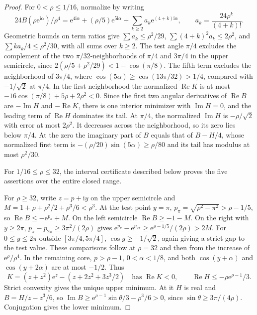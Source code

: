 \documentclass[11pt]{article}
\DeclareMathOperator{\Rea}{Re}
\DeclareMathOperator{\Ima}{Im}
\newcommand{\ee}{\mathrm e}
\newcommand{\ii}{\mathrm i}
\begin{document}
\begin{proof}
For \(0<\rho\le1/16\), normalize by writing
\[
 24B(\rho\ee^{\ii\alpha})/\rho^4
 =\ee^{4\ii\alpha}+(\rho/5)\ee^{5\ii\alpha}
  +\sum_{k\ge2} a_k\ee^{(4+k)\ii\alpha},
 \qquad a_k=\frac{24\rho^k}{(4+k)!}.
\]
Geometric bounds on term ratios give
\(\sum a_k\le\rho^2/29\), \(\sum(4+k)^2a_k\le2\rho^2\), and
\(\sum k a_k/4\le\rho^2/30\), with all sums over \(k\ge2\).
The test angle \(\pi/4\) excludes the complement of the two \(\pi/32\)-neighborhoods of \(\pi/4\) and \(3\pi/4\) in the upper semicircle, since \(2(\rho/5+\rho^2/29)<1-\cos(\pi/8)\). The fifth term excludes the neighborhood of \(3\pi/4\), where \(\cos(5\alpha)\ge\cos(13\pi/32)>1/4\), compared with \(-1/\sqrt2\) at \(\pi/4\). In the first neighborhood the normalized \(\Rea K\) is at most \(-16\cos(\pi/8)+5\rho+2\rho^2<0\). Since the first two angular derivatives of \(\Rea B\) are \(-\Ima H\) and \(-\Rea K\), there is one interior minimizer with \(\Ima H=0\), and the leading term of \(\Rea H\) dominates its tail. At \(\pi/4\), the normalized \(\Ima H\) is \(-\rho/\sqrt2\) with error at most \(2\rho^2\). It decreases across the neighborhood, so its zero lies below \(\pi/4\). At the zero the imaginary part of \(B\) equals that of \(B-H/4\), whose normalized first term is \(-(\rho/20)\sin(5\alpha)\ge\rho/80\) and its tail has modulus at most \(\rho^2/30\).

For \(1/16\le\rho\le32\), the interval certificate described below proves the five assertions over the entire closed range.

For \(\rho\ge32\), write \(z=p+\ii y\) on the upper semicircle and \(M=1+\rho+\rho^2/2+\rho^3/6<\rho^3\). At the test point \(y=\pi\), \(p_\pi=\sqrt{\rho^2-\pi^2}>\rho-1/5\), so \(\Rea B\le-\ee^{p_\pi}+M\). On the left semicircle \(\Rea B\ge-1-M\). On the right with \(y\ge2\pi\), \(p_\pi-p_{2\pi}\ge3\pi^2/(2\rho)\) gives
\(\ee^{p_\pi}-\ee^{p_{2\pi}}\ge\ee^{\rho-1/5}/(2\rho)>2M\).
For \(0\le y\le2\pi\) outside \([3\pi/4,5\pi/4]\), \(\cos y\ge-1/\sqrt2\), again giving a strict gap to the test value. These comparisons follow at \(\rho=32\) and then from the increase of \(\ee^\rho/\rho^4\). In the remaining core, \(p>\rho-1\), \(0<\alpha<1/8\), and both \(\cos(y+\alpha)\) and \(\cos(y+2\alpha)\) are at most \(-1/2\). Thus
\[
 K=(z+z^2)\ee^z-(z+2z^2+3z^3/2)
 \quad\text{has }\Rea K<0,\qquad
 \Rea H\le-\rho\ee^{\rho-1}/3 .
\]
Strict convexity gives the unique upper minimum. At it \(H\) is real and \(B=H/z-z^3/6\), so
\(\Ima B\ge\ee^{\rho-1}\sin\theta/3-\rho^3/6>0\), since
\(\sin\theta\ge3\pi/(4\rho)\). Conjugation gives the lower minimum.
\end{proof}
\end{document}
